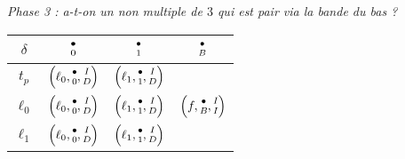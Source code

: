 \begin{center}
	\emph{\small Phase 3 : a-t-on un non multiple de $3$ qui est pair via la bande du bas ?}
	
	\smallskip
	\renewcommand{\arraystretch}{1.25}
	\begin{tabular}{|c||c|c|c|}
		\hline
		$\delta$ 
			& ${\scriptsize\begin{matrix}\bullet\\0\end{matrix}}$ 
			& ${\scriptsize\begin{matrix}\bullet\\1\end{matrix}}$ 
			& ${\scriptsize\begin{matrix}\bullet\\B\end{matrix}}$  \\
		\hline
		\hline
		$t_p$
			& $\left( \ell_0 , {\scriptsize\begin{matrix}\bullet\\0\end{matrix}} , {\scriptsize\begin{matrix}I\\D\end{matrix}} \right)$
			& $\left( \ell_1 , {\scriptsize\begin{matrix}\bullet\\1\end{matrix}} , {\scriptsize\begin{matrix}I\\D\end{matrix}} \right)$
			&                                                                   \\
		\hline
		\hline
		$\ell_0$
			& $\left( \ell_0 , {\scriptsize\begin{matrix}\bullet\\0\end{matrix}} , {\scriptsize\begin{matrix}I\\D\end{matrix}} \right)$
			& $\left( \ell_1 , {\scriptsize\begin{matrix}\bullet\\1\end{matrix}} , {\scriptsize\begin{matrix}I\\D\end{matrix}} \right)$
			& $\left( f      , {\scriptsize\begin{matrix}\bullet\\B\end{matrix}} , {\scriptsize\begin{matrix}I\\I\end{matrix}} \right)$ \\
		\hline
		$\ell_1$
			& $\left( \ell_0 , {\scriptsize\begin{matrix}\bullet\\0\end{matrix}} , {\scriptsize\begin{matrix}I\\D\end{matrix}} \right)$
			& $\left( \ell_1 , {\scriptsize\begin{matrix}\bullet\\1\end{matrix}} , {\scriptsize\begin{matrix}I\\D\end{matrix}} \right)$
			&                                                                   \\
		\hline
	\end{tabular}
	\renewcommand{\arraystretch}{1}
\end{center}